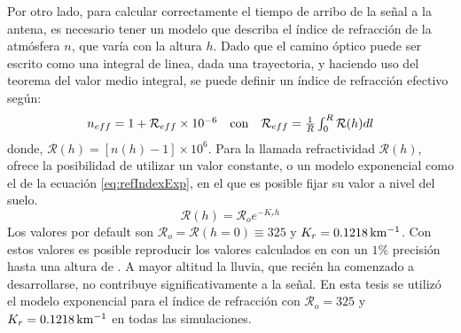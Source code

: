 		Por otro lado, para calcular correctamente el tiempo de arribo de la se\~nal a la antena, es necesario tener un modelo que describa el \'indice de refracci\'on de la atm\'osfera $n$, que var\'ia con la altura $h$.
		Dado que el camino \'optico puede ser escrito como una integral de linea, dada una trayectoria, y haciendo uso del teorema del valor medio integral, se puede definir un \'indice de refracci\'on efectivo seg\'un:
		\begin{equation}
			\begin{matrix}
			n_{eff}
			=
			1+{\mathcal R}_{eff}\times10^{-6}
			&
			{\rm con}
			&
			{\mathcal R}_{eff}
			=
			\frac{1}{R}\int_0^R{\mathcal R}(h)dl
			\end{matrix}
		\label{eq:refIndexEff}
		\end{equation}
		donde, ${\mathcal R}(h) = \left[ n(h)-1 \right] \times 10^6$.
		Para la llamada refractividad ${\mathcal R}(h)$, \zhs{} ofrece la posibilidad de utilizar un valor constante, o un modelo exponencial como el de la ecuaci\'on \ref{eq:refIndexExp}, en el que es posible fijar su valor a nivel del suelo.
		\begin{equation}
		{\mathcal R}(h)
		=
		{\mathcal R}_o
		e^{-K_rh}
		\label{eq:refIndexExp}
		\end{equation}
		Los valores por default son ${\mathcal R}_o={\mathcal R}(h=0)\equiv 325$ y $K_r=0.1218{\rm\, km^{-1}}$.
		Con estos valores es posible reproducir los valores calculados en \cite{gerson1948polar} con un $1\%$ precisi\'on hasta una altura de .
		A mayor altitud la lluvia, que reci\'en ha comenzado a desarrollarse, no contribuye significativamente a la se\~nal.
		En esta tesis se utiliz\'o el modelo exponencial para el \'indice de refracci\'on con ${\mathcal R}_o=325$ y $K_r=0.1218{\rm\, km^{-1}}$ en todas las simulaciones.
		
